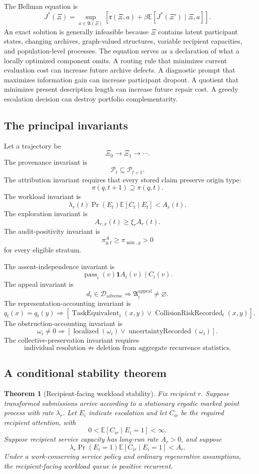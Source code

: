 \documentclass[11pt]{article}
\newtheorem{theorem}[definition]{Theorem}
\theoremstyle{definition}
\DeclareMathOperator{\Prob}{Pr}
\newcommand{\E}{\mathbb{E}}
\newcommand{\ind}{\mathbf{1}}
\begin{document}
The Bellman equation is
\[
J^{*}(\Xi)
=
\sup_{a\in\mathfrak{A}(\Xi)}
\left[
\mathfrak{r}(\Xi,a)
+
\beta
\E[
J^{*}(\Xi')
\mid
\Xi,a
]
\right].
\]
An exact solution is generally infeasible because \(\Xi\) contains latent participant states, changing archives, graph-valued structures, variable recipient capacities, and population-level processes. The equation serves as a declaration of what a locally optimized component omits. A routing rule that minimizes current evaluation cost can increase future archive defects. A diagnostic prompt that maximizes information gain can increase participant dropout. A quotient that minimizes present description length can increase future repair cost. A greedy escalation decision can destroy portfolio complementarity.

\subsection{The principal invariants}

Let a trajectory be
\[
\Xi_0
\to
\Xi_1
\to
\cdots.
\]
The provenance invariant is
\[
\mathcal{P}_t
\subseteq
\mathcal{P}_{t+1}.
\]
The attribution invariant requires that every stored claim preserve origin type:
\[
\pi(q,t+1)
\supseteq
\pi(q,t).
\]
The workload invariant is
\[
\lambda_r(t)
\Prob(E_t)
\E[C_t\mid E_t]
<
A_r(t).
\]
The exploration invariant is
\[
A_{r,x}(t)\geq\xi_rA_r(t).
\]
The audit-positivity invariant is
\[
\pi_{g,t}^{A}\geq\pi_{\min,g}>0
\]
for every eligible stratum.

The assent-independence invariant is
\[
\operatorname{pass}_i(v)
\ind
A_i(v)
\mid
C_i(v).
\]
The appeal invariant is
\[
d_i\in\mathcal{D}_{\mathrm{adverse}}
\Longrightarrow
\mathfrak{A}_i^{\mathrm{appeal}}\neq\varnothing.
\]
The representation-accounting invariant is
\[
q_t(x)=q_t(y)
\Longrightarrow
\left[
\operatorname{TaskEquivalent}_t(x,y)
\lor
\operatorname{CollisionRiskRecorded}_t(x,y)
\right].
\]
The obstruction-accounting invariant is
\[
\omega_i\neq0
\Longrightarrow
\left[
\operatorname{localized}(\omega_i)
\lor
\operatorname{uncertaintyRecorded}(\omega_i)
\right].
\]
The collective-preservation invariant requires
\[
\text{individual resolution}
\not\Longrightarrow
\text{deletion from aggregate recurrence statistics}.
\]

\subsection{A conditional stability theorem}

\begin{theorem}[Recipient-facing workload stability]
Fix recipient \(r\). Suppose transformed submissions arrive according to a stationary ergodic marked point process with rate \(\lambda_r\). Let \(E_i\) indicate escalation and let \(C_{ir}\) be the required recipient attention, with
\[
0<
\E[C_{ir}\mid E_i=1]
<
\infty.
\]
Suppose recipient service capacity has long-run rate \(A_r>0\), and suppose
\[
\lambda_r
\Prob(E_i=1)
\E[C_{ir}\mid E_i=1]
<
A_r.
\]
Under a work-conserving service policy and ordinary regenerative assumptions, the recipient-facing workload queue is positive recurrent.
\end{theorem}
\end{document}
